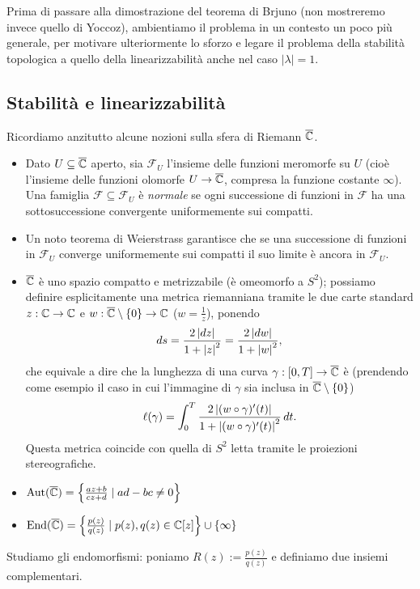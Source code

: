 Prima di passare alla dimostrazione del teorema di Brjuno (non mostreremo invece quello di Yoccoz), ambientiamo il problema in un contesto un poco più generale, per motivare ulteriormente lo sforzo e legare il problema della stabilità topologica a quello della linearizzabilità anche nel caso $|\lambda|=1$.

\subsection{Stabilità e linearizzabilità}

Ricordiamo anzitutto alcune nozioni sulla sfera di Riemann $\overline{\mathbb{C}}$. 
\begin{itemize}
 \item Dato $U\subseteq\overline{\mathbb{C}}$ aperto, sia $\mathcal{F}_U$ l'insieme delle funzioni meromorfe su $U$
      (cioè l'insieme delle funzioni olomorfe $U\to\overline{\mathbb{C}}$, compresa la funzione costante $\infty$).
      Una famiglia $\mathcal{F}\subseteq\mathcal{F}_U$ è \emph{normale} se ogni successione di funzioni in $\mathcal{F}$
      ha una sottosuccessione convergente uniformemente sui compatti.
 \item Un noto teorema di Weierstrass garantisce che se una successione di funzioni
      in $\mathcal{F}_U$ converge uniformemente sui compatti il suo limite è ancora in $\mathcal{F}_U$.
 \item $\overline{\mathbb{C}}$ è uno spazio compatto e metrizzabile (è omeomorfo a $S^2$);
      possiamo definire esplicitamente una metrica riemanniana tramite le due carte standard $z:\mathbb{C}\to\mathbb{C}$
      e $w:\overline{\mathbb{C}}\setminus\left\{0\right\}\to\mathbb{C}$ ($w=\frac{1}{z}$), ponendo
      \[ ds=\frac{2\left|dz\right|}{1+\left|z\right|^2}=\frac{2\left|dw\right|}{1+\left|w\right|^2}, \]
      che equivale a dire che la lunghezza di una curva $\gamma:[0,T]\to\overline{\mathbb{C}}$ è
      (prendendo come esempio il caso in cui l'immagine di $\gamma$ sia inclusa in $\overline{\mathbb{C}}\setminus\left\{0\right\}$)
      \[ \ell(\gamma)=\int_0^T \frac{2\left|(w\circ\gamma)'(t)\right|}{1+\left|(w\circ\gamma)'(t)\right|^2}\,dt. \]
      Questa metrica coincide con quella di $S^2$ letta tramite le proiezioni stereografiche.
 \item $\operatorname{Aut}(\overline{\mathbb{C}})=\left\{\frac{az+b}{cz+d}\mid ad-bc\neq 0\right\}$
 \item $\operatorname{End}(\overline{\mathbb{C}})=\left\{\frac{p(z)}{q(z)}\mid p(z),q(z)\in\mathbb{C}[z]\right\}\cup\left\{\infty\right\}$
\end{itemize}

Studiamo gli endomorfismi: poniamo $R(z):=\frac{p(z)}{q(z)}$ e definiamo due insiemi complementari.

